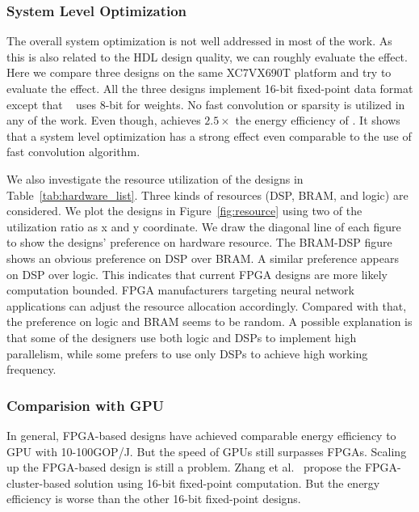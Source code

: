 \subsubsection*{\textbf{System Level Optimization}} The overall system optimization is not well addressed in most of the work. As this is also related to the HDL design quality, we can roughly evaluate the effect. Here we compare three designs\cite{zhang2016caffeine, liu2016automatic, li2016high} on the same XC7VX690T platform and try to evaluate the effect. All the three designs implement 16-bit fixed-point data format except that ~\cite{liu2016automatic} uses 8-bit for weights. No fast convolution or sparsity is utilized in any of the work. Even though, \cite{li2016high} achieves $2.5\times$ the energy efficiency of \cite{liu2016automatic}. It shows that a system level optimization has a strong effect even comparable to the use of fast convolution algorithm. 

We also investigate the resource utilization of the designs in Table~\ref{tab:hardware_list}. Three kinds of resources (DSP, BRAM, and logic) are considered. We plot the designs in Figure~\ref{fig:resource} using two of the utilization ratio as x and y coordinate. We draw the diagonal line of each figure to show the designs' preference on hardware resource. The BRAM-DSP figure shows an obvious preference on DSP over BRAM. A similar preference appears on DSP over logic. This indicates that current FPGA designs are more likely computation bounded. FPGA manufacturers targeting neural network applications can adjust the resource allocation accordingly. Compared with that, the preference on logic and BRAM seems to be random. A possible explanation is that some of the designers use both logic and DSPs to implement high parallelism, while some prefers to use only DSPs to achieve high working frequency. 

\subsubsection*{\textbf{Comparision with GPU}} In general, FPGA-based designs have achieved comparable energy efficiency to GPU with 10-100GOP/J. But the speed of GPUs still surpasses FPGAs. Scaling up the FPGA-based design is still a problem. Zhang et al.~\cite{zhang2016energy} propose the FPGA-cluster-based solution using 16-bit fixed-point computation. But the energy efficiency is worse than the other 16-bit fixed-point designs. 

